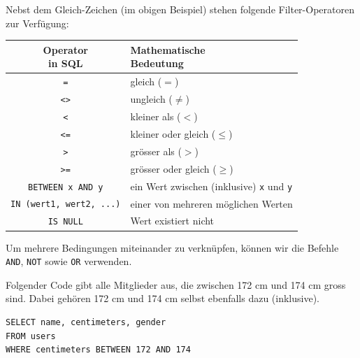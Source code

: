 Nebst dem Gleich-Zeichen (im obigen Beispiel) stehen folgende Filter-Operatoren zur Verfügung:
\begin{table}[H]
  \centering
  \begin{tabular}{c|l}
    \makecell{\textbf{Operator}                                                                 \\\textbf{in \gls{SQL}}} & \makecell{\textbf{Mathematische}\\\textbf{Bedeutung}} \\\midrule
    \texttt{=}                                    & gleich ($=$)                                \\
    \texttt{<>}                                   & ungleich ($\neq$)                           \\
    \texttt{<}                                    & kleiner als ($<$)                           \\
    \texttt{<=}                                   & kleiner oder gleich ($\leq$)                \\
    \texttt{>}                                    & grösser als ($>$)                           \\
    \texttt{>=}                                   & grösser oder gleich ($\geq$)                \\
    \lstinline|BETWEEN x AND y|        & ein Wert zwischen (inklusive) \texttt{x} und \texttt{y} \\
    \lstinline|IN (wert1, wert2, ...)| & einer von mehreren möglichen Werten         \\
    \lstinline|IS NULL|                & Wert existiert nicht                        \\
  \end{tabular}
\end{table}
Um mehrere Bedingungen miteinander zu verknüpfen, können wir die Befehle \lstinline|AND|, \lstinline|NOT| sowie \lstinline|OR| verwenden.

\begin{myexample}\label{myexample:between}
Folgender Code gibt alle Mitglieder aus, die zwischen 172 cm und 174 cm gross sind. Dabei gehören 172 cm und 174 cm selbst ebenfalls dazu (inklusive).

\begin{lstlisting}
SELECT name, centimeters, gender 
FROM users 
WHERE centimeters BETWEEN 172 AND 174 
\end{lstlisting}
\end{myexample}

